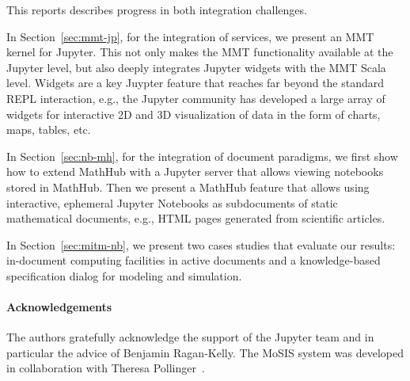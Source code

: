 
This reports describes progress in both integration challenges.

In Section~\ref{sec:mmt-jp}, for the integration of services, we present an MMT kernel for Jupyter.
This not only makes the MMT functionality available at the Jupyter level, but also deeply integrates Jupyter widgets with the MMT Scala level.
Widgets are a key Juypter feature that reaches far beyond the standard REPL interaction, e.g., the Jupyter community has developed a large array of widgets for interactive 2D and 3D visualization of data in the form of charts, maps, tables, etc.

In Section~\ref{sec:nb-mh}, for the integration of document paradigms, we first show how to extend MathHub with a Jupyter server that allows viewing notebooks stored in MathHub.
Then we present a MathHub feature that allows using interactive, ephemeral Jupyter Notebooks as subdocuments of static mathematical documents, e.g., HTML pages generated from scientific articles.

In Section~\ref{sec:mitm-nb}, we present two cases studies that evaluate our results: in-document computing facilities in active documents and a knowledge-based specification dialog for modeling and simulation. 

\paragraph{Acknowledgements}
The authors gratefully acknowledge the support of the Jupyter team and in particular the advice of Benjamin Ragan-Kelly.
The MoSIS system was developed in collaboration with Theresa Pollinger~\cite{PolKohKoe:kacse18}. 

